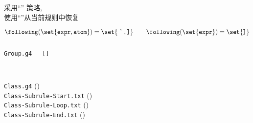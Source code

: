 \begin{frame}{}
  \begin{center}

    \vspace{0.80cm}
    采用``'' 策略, \\[5pt]
    使用``''从{当前规则}中恢复
  \end{center}
\end{frame}

\begin{frame}{}
  \[
    \following(\set{\texttt{expr}, \texttt{atom}}) = \set{\hat{\quad}, \texttt{]}} \qquad
    \following(\set{\texttt{expr}}) = \set{\texttt{]}}
  \]

  \vspace{-0.20cm}
  \begin{columns}
      \begin{center}

        \vspace{0.50cm}
        \texttt{Group.g4} \\[15pt]
      \end{center}
      \begin{center}

        \vspace{0.50cm}
        \texttt{[]}
      \end{center}
  \end{columns}

  \pause
  \vspace{0.60cm}
  \begin{center}
  \end{center}
\end{frame}

\begin{frame}{}
  \begin{center}

    \vspace{0.80cm}
     \\[20pt]

    \texttt{Class.g4} (\texttt{}) \\[20pt]
    \texttt{Class-Subrule-Start.txt} () \\[10pt]
    \texttt{Class-Subrule-Loop.txt} () \\[10pt]
    \texttt{Class-Subrule-End.txt} ()
  \end{center}
\end{frame}

